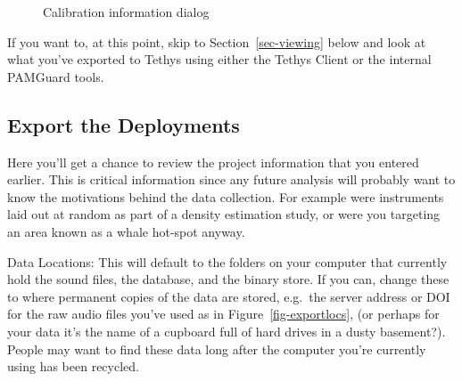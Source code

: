 \documentclass[
]{article}
\begin{document}
\begin{figure}
\begin{minipage}{0.50\linewidth}
{}


\end{minipage}%

\caption{\label{fig-cal}Calibration information dialog}

\end{figure}%

\begin{tcolorbox}[enhanced jigsaw, titlerule=0mm, coltitle=black, opacitybacktitle=0.6, breakable, toptitle=1mm, rightrule=.15mm, left=2mm, leftrule=.75mm, colback=white, arc=.35mm, bottomtitle=1mm, bottomrule=.15mm, toprule=.15mm, colframe=quarto-callout-tip-color-frame, title=\textcolor{quarto-callout-tip-color}{\faLightbulb}\hspace{0.5em}{See what you've exported so far}, colbacktitle=quarto-callout-tip-color!10!white, opacityback=0]

If you want to, at this point, skip to Section~\ref{sec-viewing} below
and look at what you've exported to Tethys using either the Tethys
Client or the internal PAMGuard tools.

\end{tcolorbox}

\subsection{Export the Deployments}\label{export-the-deployments}

Here you'll get a chance to review the project information that you
entered earlier. This is critical information since any future analysis
will probably want to know the motivations behind the data collection.
For example were instruments laid out at random as part of a density
estimation study, or were you targeting an area known as a whale
hot-spot anyway.

Data Locations: This will default to the folders on your computer that
currently hold the sound files, the database, and the binary store. If
you can, change these to where permanent copies of the data are stored,
e.g.~the server address or DOI for the raw audio files you've used as in
Figure~\ref{fig-exportlocs}, (or perhaps for your data it's the name of
a cupboard full of hard drives in a dusty basement?). People may want to
find these data long after the computer you're currently using has been
recycled.
\end{document}
